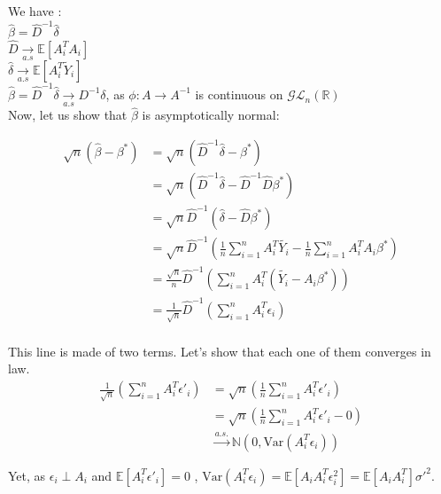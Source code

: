 \documentclass{article}
\begin{document}
We have : \\

$\hat{\beta} = \hat{D} ^{-1} \hat{\delta} $\\


$\hat{D}  \underset{a.s}{\rightarrow}  \mathbb{E}[A_i ^T A_i ]$ \\


$\hat{\delta}   \underset{a.s}{\rightarrow}  \mathbb{E}[A_i ^T \tilde{Y}_i ] $\\


$\hat{\beta} = \hat{D}^{-1} \hat{\delta}  \underset{a.s}{\rightarrow}  D^{-1} \delta$, as  $\phi : A \rightarrow  A^{-1}$ is continuous on $\mathcal{GL}_n(\mathbb {R} )$ \\


Now, let us show that $\hat{\beta}$ is asymptotically normal: 


\begin{align*}
    \sqrt{n} ( \hat{\beta} - \beta ^* ) &= \sqrt{n} (\hat{D}^{-1} \hat{\delta} - \beta ^* ) \\
     &= \sqrt{n} (\hat{D}^{-1} \hat{\delta} - \hat{D}^{-1} \hat{D} \beta ^* ) \\
     &= \sqrt{n} \hat{D}^{-1} (\hat{\delta} -  \hat{D} \beta ^* )  \\
     &= \sqrt{n} \hat{D}^{-1} (\frac{1}{n} \sum_{i=1}^{n} A_i ^T \tilde{Y_i} - \frac{1}{n}  \sum_{i=1}^{n}  A_i ^T A_i \beta ^* )  \\
     &= \frac{\sqrt{n}}{n} \hat{D}^{-1} (\sum_{i=1}^{n} A_i ^T (\tilde{Y_i} -    A_i \beta ^* ) )   \\
     & = \frac{1}{\sqrt{n}}  \hat{D} ^{-1} (\sum_{i=1}^{n}  A_i ^T \epsilon _ i )  \\
\end{align*}


This line is made of two terms. Let's show that each one of them converges in law.  \\



\begin{align*}
    \frac{1}{\sqrt{n}} \left( \sum_{i=1}^{n}  A_i^T \epsilon'_i \right) &= \sqrt{n} \left( \frac{1}{n} \sum_{i=1}^{n}  A_i^T \epsilon'_i \right) \\
    &= \sqrt{n} \left( \frac{1}{n} \sum_{i=1}^{n}  A_i^T \epsilon'_i - 0 \right) \\
    &\xrightarrow{a.s.} \mathbb{N}(0, \text{Var}(A_i^T \epsilon_i) )
\end{align*}

Yet, as $\epsilon_i \perp A_i $ and $\mathbb{E} [ A_i^T \epsilon'_i] = 0 $ , $\text{Var}(A_i^T \epsilon_i) = \mathbb{E}[A_i A_i ^T \epsilon_i ^2 ] = \mathbb{E} [ A_i A_i ^T ] \sigma'^2$. 
\end{document}
